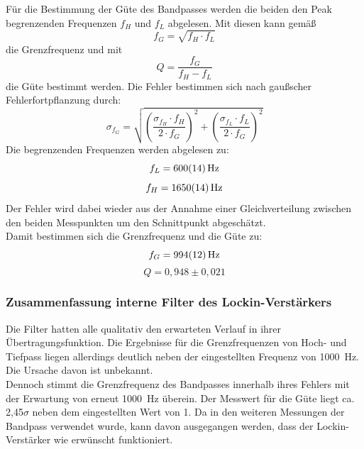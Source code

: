 \documentclass[12pt,a4paper]{article}
\begin{document}
Für die Bestimmung der Güte des Bandpasses werden die beiden den Peak begrenzenden Frequenzen $f_H$ und $f_L$ abgelesen. Mit diesen kann gemäß
\begin{equation*}
f_G = \sqrt{f_H \cdot f_L}
\end{equation*}
die Grenzfrequenz und mit
\begin{equation*}
Q = \dfrac{f_G}{f_H - f_L}
\end{equation*}
die Güte bestimmt werden. Die Fehler bestimmen sich nach gaußscher Fehlerfortpflanzung durch:
\begin{equation*}
\sigma _{f_G} = \sqrt{\left( \dfrac{\sigma _{f_H} \cdot f_H}{2 \cdot f_G} \right)^2 + \left( \dfrac{\sigma _{f_L} \cdot f_L}{2 \cdot f_G} \right)^2}
\end{equation*}
Die begrenzenden Frequenzen werden abgelesen zu:
\begin{equation*}
f_L = \SI{600 \pm 14}{Hz}
\end{equation*}
\begin{equation*}
f_H = \SI{1650 \pm 14}{Hz}
\end{equation*}
Der Fehler wird dabei wieder aus der Annahme einer Gleichverteilung zwischen den beiden Messpunkten um den Schnittpunkt abgeschätzt. \\
Damit bestimmen sich die Grenzfrequenz und die Güte zu:
\begin{equation*}
f_G = \SI{994 \pm 12}{Hz}
\end{equation*}
\begin{equation*}
Q = 0,948 \pm 0,021
\end{equation*}

\subsubsection{Zusammenfassung interne Filter des Lockin-Verstärkers}
Die Filter hatten alle qualitativ den erwarteten Verlauf in ihrer Übertragungsfunktion. Die Ergebnisse für die Grenzfrequenzen von Hoch- und Tiefpass liegen allerdings deutlich neben der eingestellten Frequenz von \SI{1000}{Hz}. Die Ursache davon ist unbekannt. \\
Dennoch stimmt die Grenzfrequenz des Bandpasses innerhalb ihres Fehlers mit der Erwartung von erneut \SI{1000}{Hz} überein. Der Messwert für die Güte liegt ca. 2,45$\sigma$ neben dem eingestellten Wert von 1. Da in den weiteren Messungen der Bandpass verwendet wurde, kann davon ausgegangen werden, dass der Lockin-Verstärker wie erwünscht funktioniert.
\end{document}
